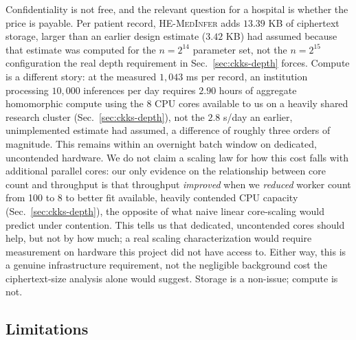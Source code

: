 \documentclass[journal,compsoc]{IEEEtran}
\newcommand{\framework}{\textsc{HE-MedInfer}}
\begin{document}
Confidentiality is not free, and the relevant question for a hospital is
whether the price is payable. Per patient record, \framework{} adds $13.39$ KB
of ciphertext storage, larger than an earlier design estimate ($3.42$ KB) had
assumed because that estimate was computed for the $n = 2^{14}$ parameter
set, not the $n = 2^{15}$ configuration the real depth requirement in
Sec.~\ref{sec:ckks-depth} forces. Compute is a different story: at
the measured $1{,}043$ ms per record, an institution processing $10{,}000$
inferences per day requires $2.90$ hours of aggregate homomorphic compute
using the 8 CPU cores available to us on a heavily shared research cluster
(Sec.~\ref{sec:ckks-depth}), not the $2.8$ s/day an earlier, unimplemented
estimate had assumed, a difference of roughly three orders of magnitude. This
remains within an overnight batch window on dedicated, uncontended hardware.
We do not claim a scaling law for how this cost falls with additional
parallel cores: our only evidence on the relationship between core count and
throughput is that throughput \emph{improved} when we \emph{reduced} worker
count from 100 to 8 to better fit available, heavily contended CPU capacity
(Sec.~\ref{sec:ckks-depth}), the opposite of what naive linear core-scaling
would predict under contention. This tells us that dedicated, uncontended
cores should help, but not by how much; a real scaling characterization would
require measurement on hardware this project did not have access to. Either
way, this is a genuine infrastructure requirement, not the
negligible background cost the ciphertext-size analysis alone would suggest.
Storage is a non-issue; compute is not.

\subsection{Limitations}
\end{document}

